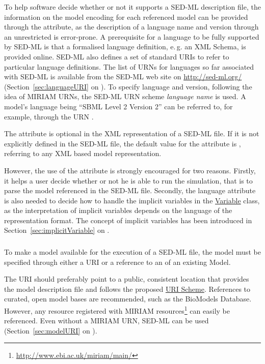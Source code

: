 To help  software decide whether or not it supports a SED-ML description file, the information on the model encoding for each referenced model can be provided through the  attribute, as the description of a language name and version through an unrestricted  is error-prone. 
A prerequisite for a language to be fully supported by SED-ML is that a formalised language definition, e.\,g. an XML Schema, is provided online. SED-ML also defines a set of standard URIs to refer to particular language definitions. 
The list of URNs for languages so far associated with SED-ML is available from the SED-ML web site on \url{http://sed-ml.org/}  (Section~\ref{sec:languageURI} on ). 
To specify language and version, following the idea of MIRIAM URNs, the SED-ML URN scheme \emph{language name} is used. A model's language being ``SBML Level 2 Version 2'' can be referred to, for example, through the URN .

The  attribute is optional in the XML representation of a SED-ML file. 
If it is not explicitly defined in the SED-ML file, the default value for the  attribute is , referring to any XML based model representation. 

However, the use of the  attribute is strongly encouraged for two reasons. 
Firstly, it helps a user decide whether or not he is able to run the simulation, that is to parse the model referenced in the SED-ML file. 
Secondly, the language attribute is also needed to decide how to handle the implicit variables in the \hyperref[class:variable]{Variable} class, as the interpretation of implicit variables depends on the language of the representation format. The concept of implicit variables has been introduced in Section~\ref{sec:implicitVariable} on .


\subsubsection{}
\label{sec:source}
To make a model available for the execution of a SED-ML file, the model  must be specified through either a URI or a reference to an  of an existing Model. 

The URI should preferably point to a public, consistent location that provides the model description file and follows the proposed \hyperref[sec:uriScheme]{URI Scheme}. References to curated, open model bases are recommended, such as the BioModels Database. However, any resource registered with MIRIAM resources\footnote{\url{http://www.ebi.ac.uk/miriam/main/}} can easily be referenced. Even without a MIRIAM URN, SED-ML can be used (Section~\ref{sec:modelURI} on ).

